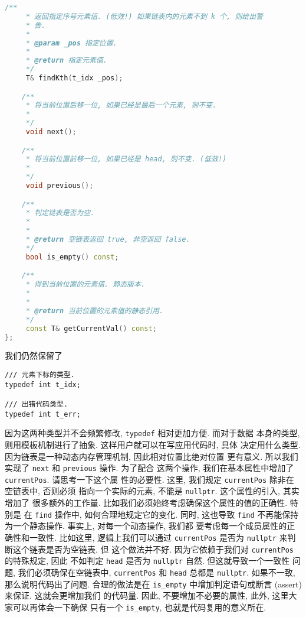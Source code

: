\documentclass[a4paper]{ctexart}
\theoremstyle{definition}
\theoremstyle{definition}
\begin{document}
\begin{lstlisting}[language=C++]
    /** 
     * 返回指定序号元素值. (低效!) 如果链表内的元素不到 k 个, 则给出警
     * 告.
     * 
     * @param _pos 指定位置.
     * 
     * @return 指定元素值.
     */
     T& findKth(t_idx _pos);

    /** 
     * 将当前位置后移一位, 如果已经是最后一个元素, 则不变.
     * 
     */
     void next();

    /** 
     * 将当前位置前移一位, 如果已经是 head, 则不变. (低效!)
     * 
     */
     void previous();

    /** 
     * 判定链表是否为空.
     * 
     * 
     * @return 空链表返回 true, 非空返回 false.
     */
     bool is_empty() const;

    /** 
     * 得到当前位置的元素值. 静态版本.
     * 
     * 
     * @return 当前位置的元素值的静态引用.
     */
     const T& getCurrentVal() const; 
};
\end{lstlisting}

我们仍然保留了
\begin{verbatim}
/// 元素下标的类型.
typedef int t_idx;

/// 出错代码类型.
typedef int t_err;
\end{verbatim}
因为这两种类型并不会频繁修改, \verb|typedef| 相对更加方便. 而对于数据
本身的类型, 则用模板机制进行了抽象. 这样用户就可以在写应用代码时, 具体
决定用什么类型. 因为链表是一种动态内存管理机制, 因此相对位置比绝对位置
更有意义. 所以我们实现了 \verb|next| 和 \verb|previous| 操作. 为了配合
这两个操作, 我们在基本属性中增加了 \verb|currentPos|. 请思考一下这个属
性的必要性. 这里, 我们规定 \verb|currentPos| 除非在空链表中, 否则必须
指向一个实际的元素, 不能是 \verb|nullptr|. 这个属性的引入, 其实增加了
很多额外的工作量. 比如我们必须始终考虑确保这个属性的值的正确性. 特别是
在 \verb|find| 操作中, 如何合理地规定它的变化. 同时, 这也导致
\verb|find| 不再能保持为一个静态操作. 事实上, 对每一个动态操作, 我们都
要考虑每一个成员属性的正确性和一致性. 比如这里, 逻辑上我们可以通过
\verb|currentPos| 是否为 \verb|nullptr| 来判断这个链表是否为空链表. 但
这个做法并不好. 因为它依赖于我们对 \verb|currentPos| 的特殊规定, 因此
不如判定 \verb|head| 是否为 \verb|nullptr| 自然. 但这就导致一个一致性
问题, 我们必须确保在空链表中, \verb|currentPos| 和 \verb|head| 总都是
\verb|nullptr|. 如果不一致, 那么说明代码出了问题. 合理的做法是在
\verb|is_empty| 中增加判定语句或断言 (assert) 来保证. 这就会更增加我们
的代码量. 因此, 不要增加不必要的属性, 此外, 这里大家可以再体会一下确保
只有一个 \verb|is_empty|, 也就是代码复用的意义所在.
\end{document}
